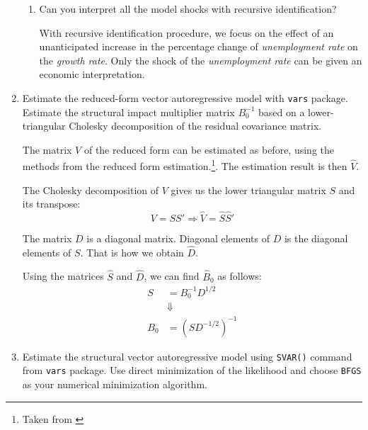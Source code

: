 \begin{enumerate}
\begin{enumerate}[label=\roman*.]
              \item Can you interpret all the model shocks with recursive identification?

                    \begin{sol}
                        With recursive identification procedure, we focus on the effect of an unanticipated increase in the percentage change of \emph{unemployment rate} on the \emph{growth rate}. Only the shock of the \emph{unemployment rate} can be given an economic interpretation.
                    \end{sol}
          \end{enumerate}

    \item Estimate the reduced-form vector autoregressive model with \verb|vars| package. Estimate the structural impact multiplier matrix $B_0^{-1}$ based on a lower-triangular Cholesky decomposition of the residual covariance matrix.

          \begin{sol}
              The matrix $V$ of the reduced form can be estimated as before, using the methods from the reduced form estimation.\footnote{Taken from \cite[][see page 495]{MartinHurnHarris-2012}}. The estimation result is then $\hat V$.

              The Cholesky decomposition of $V$ gives us the lower triangular matrix $S$ and its transpose:
              \[ V = S S' \Rightarrow \hat V = \hat S \hat S' \]

              The matrix $D$ is a diagonal matrix. Diagonal elements of $D$ is the diagonal elements of $S$. That is how we obtain $\hat D$.

              Using the matrices $\hat S$ and $\hat D$, we can find $\hat B_0$ as follows:
              \begin{align*}
                  S   & = B_0^{-1} D^{1/2}  \\
                      & \Downarrow          \\
                  B_0 & = (S D^{-1/2})^{-1}
              \end{align*}

              
          \end{sol}

    \item Estimate the structural vector autoregressive model using \verb|SVAR()| command from \verb|vars| package. Use direct minimization of the likelihood and choose \verb|BFGS| as your numerical minimization algorithm.


\end{enumerate}
